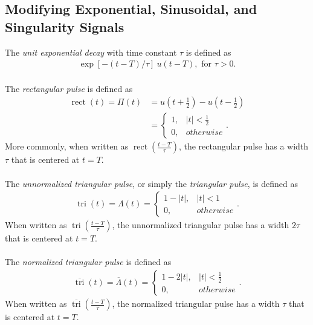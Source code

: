\documentclass{report}
\begin{document}
\subsection{Modifying Exponential, Sinusoidal, and Singularity Signals}
The \emph{unit exponential decay} with time constant $\tau$ is defined as
\begin{align}
    \operatorname{exp}[-(t-T)/\tau]\ u(t-T), \text{ for } \tau>0.
\end{align} \\
The \emph{rectangular pulse} is defined as 
\begin{align}
    \operatorname{rect}(t) = \Pi(t) &= u\left(t+\frac{1}{2}\right) - u\left(t-\frac{1}{2}\right) \\
    &=
    \begin{cases} 
        1, & |t|<\frac{1}{2} \\
        0, & otherwise
    \end{cases}.
\end{align}
More commonly, when written as $\operatorname{rect}\left(\frac{t-T}{\tau}\right)$, the rectangular pulse has a width $\tau$ that is centered at $t=T$.
\\ \\
The \emph{unnormalized triangular pulse}, or simply the \emph{triangular pulse}, is defined as 
\begin{align}
    \operatorname{tri}(t) = \Lambda(t) =
    \begin{cases} 
        1-|t|, & |t|<1 \\
        0, & otherwise
    \end{cases}.
\end{align}
When written as $\operatorname{tri}\left(\frac{t-T}{\tau}\right)$, the unnormalized triangular pulse has a width $2\tau$ that is centered at $t=T$.
\\ \\
The \emph{normalized triangular pulse} is defined as 
\begin{align}
    \overline{\operatorname{tri}}(t) = \overline{\Lambda}(t) =
    \begin{cases} 
        1-2|t|, & |t|<\frac{1}{2} \\
        0, & otherwise
    \end{cases}.
\end{align}
When written as $\overline{\operatorname{tri}}\left(\frac{t-T}{\tau}\right)$, the normalized triangular pulse has a width $\tau$ that is centered at $t=T$.
\\ \\
\end{document}
